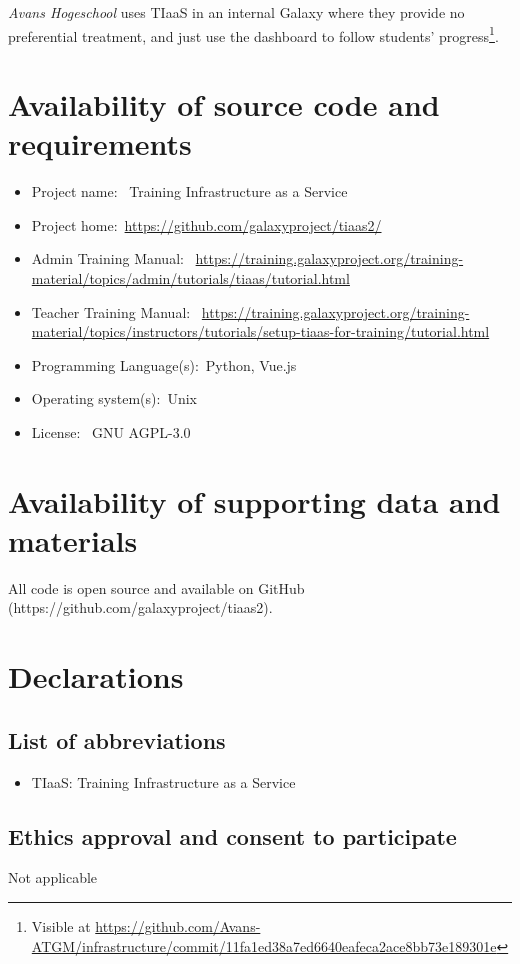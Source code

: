\documentclass[a4paper,num-refs]{oup-contemporary}
\begin{document}
\emph{Avans Hogeschool} uses TIaaS in an internal Galaxy where they provide no preferential treatment, and just use the dashboard to follow students' progress\footnote{Visible at \url{https://github.com/Avans-ATGM/infrastructure/commit/11fa1ed38a7ed6640eafeca2ace8bb73e189301e}}.

\section{Availability of source code and requirements}

\begin{itemize}
\item Project name: ~Training Infrastructure as a Service
\item Project home:~\url{https://github.com/galaxyproject/tiaas2/}
\item Admin Training Manual: ~\url{https://training.galaxyproject.org/training-material/topics/admin/tutorials/tiaas/tutorial.html}
\item Teacher Training Manual: ~\url{https://training.galaxyproject.org/training-material/topics/instructors/tutorials/setup-tiaas-for-training/tutorial.html}
\item Programming Language(s):~Python, Vue.js
\item Operating system(s):~Unix
\item License: ~GNU AGPL-3.0
\end{itemize}

\section{Availability of supporting data and materials}
All code is open source and available on GitHub (https://github.com/galaxyproject/tiaas2).

\section{Declarations}

\subsection{List of abbreviations}
\begin{itemize}
\item TIaaS: Training Infrastructure as a Service
\end{itemize}

\subsection{Ethics approval and consent to participate}
Not applicable
\end{document}
